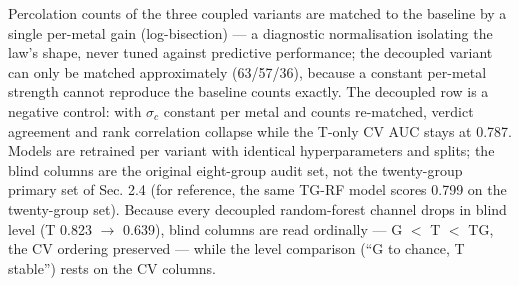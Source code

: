 \documentclass[11pt]{article}
\begin{document}
\begin{table}[p!]
\centering
\caption{\textbf{Table 4 --- Damage-law robustness audit (E6; RF classifier, grouped 5$\times$4 CV; blind = original eight-group audit set, 72 rows).}}
\vspace{0.4em}
\footnotesize
\setlength{\tabcolsep}{4pt}

\vspace{0.5em}
{\footnotesize Percolation counts of the three coupled variants are matched to the baseline by a single per-metal gain (log-bisection) --- a diagnostic normalisation isolating the law's shape, never tuned against predictive performance; the decoupled variant can only be matched approximately (63/57/36), because a constant per-metal strength cannot reproduce the baseline counts exactly. The decoupled row is a negative control: with $\sigma_{c}$ constant per metal and counts re-matched, verdict agreement and rank correlation collapse while the T-only CV AUC stays at 0.787. Models are retrained per variant with identical hyperparameters and splits; the blind columns are the original eight-group audit set, not the twenty-group primary set of Sec. 2.4 (for reference, the same TG-RF model scores 0.799 on the twenty-group set). Because every decoupled random-forest channel drops in blind level (T 0.823 $\rightarrow$ 0.639), blind columns are read ordinally --- G $<$ T $<$ TG, the CV ordering preserved --- while the level comparison (``G to chance, T stable'') rests on the CV columns.\par}
\end{table}
\end{document}
